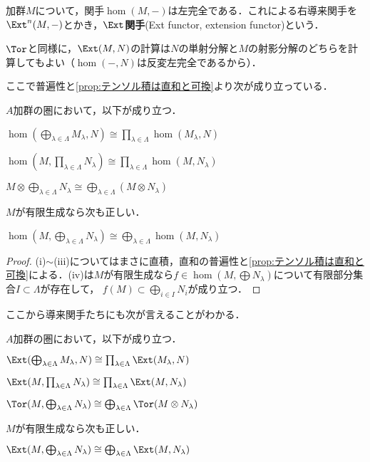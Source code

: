 \begin{defi}[$\Ext$関手]
	加群$M$について，関手$\hom(M,-)$は左完全である．これによる右導来関手を$\Ext^n(M,-)$とかき，$\Ext$\textbf{関手}(Ext functor, extension functor)という．
\end{defi}

$\Tor$と同様に，$\Ext(M,N)$の計算は$N$の単射分解と$M$の射影分解のどちらを計算してもよい（$\hom(-,N)$は反変左完全であるから）．

ここで普遍性と\ref{prop:テンソル積は直和と可換}より次が成り立っている．

\begin{prop}
	$A$加群の圏において，以下が成り立つ．
	\begin{sakura}
		\item $\hom(\bigoplus_{\lambda\in\Lambda} M_\lambda,N)\cong\prod_{\lambda\in\Lambda}\hom(M_\lambda,N)$
		\item $\hom(M,\prod_{\lambda\in\Lambda}N_\lambda)\cong\prod_{\lambda\in\Lambda}\hom(M,N_\lambda)$
		\item $M\otimes\bigoplus_{\lambda\in\Lambda}N_\lambda\cong\bigoplus_{\lambda\in\Lambda}(M\otimes N_\lambda)$
	\end{sakura}
	$M$が有限生成なら次も正しい．
	\begin{sakura}\setcounter{enumi}{3}
		\item $\hom(M,\bigoplus_{\lambda\in\Lambda}N_\lambda)\cong\bigoplus_{\lambda\in\Lambda}\hom(M,N_\lambda)$
	\end{sakura}
\end{prop}

\begin{proof}
	(i)$\sim$(iii)についてはまさに直積，直和の普遍性と\ref{prop:テンソル積は直和と可換}による．(iv)は$M$が有限生成なら$f\in\hom(M,\bigoplus N_\lambda)$について有限部分集合$I\subset\Lambda$が存在して， $f(M)\subset\bigoplus_{i\in I} N_i$が成り立つ．
\end{proof}

ここから導来関手たちにも次が言えることがわかる．

\begin{prop}
	$A$加群の圏において，以下が成り立つ．
	\begin{sakura}
		\item $\Ext(\bigoplus_{\lambda\in\Lambda} M_\lambda,N)\cong\prod_{\lambda\in\Lambda}\Ext(M_\lambda,N)$
		\item $\Ext(M,\prod_{\lambda\in\Lambda}N_\lambda)\cong\prod_{\lambda\in\Lambda}\Ext(M,N_\lambda)$
		\item $\Tor(M,\bigoplus_{\lambda\in\Lambda}N_\lambda)\cong\bigoplus_{\lambda\in\Lambda}\Tor(M\otimes N_\lambda)$
	\end{sakura}
	$M$が有限生成なら次も正しい．
	\begin{sakura}\setcounter{enumi}{3}
		\item $\Ext(M,\bigoplus_{\lambda\in\Lambda}N_\lambda)\cong\bigoplus_{\lambda\in\Lambda}\Ext(M,N_\lambda)$
	\end{sakura}
\end{prop}

